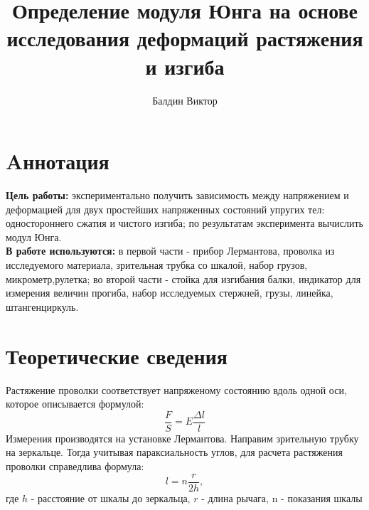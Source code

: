 \documentclass[12pt]{article}
\title{Определение модуля Юнга на основе исследования деформаций растяжения и изгиба}
\author{Балдин Виктор}
\begin{document}
    \maketitle

    \section{Aннотация}
    \textbf{Цель работы:} экспериментально получить зависимость между напряжением и деформацией
    для двух простейших напряженных состояний упругих тел: одностороннего сжатия и чистого изгиба;
    по результатам эксперимента вычислить модул Юнга.\\
    \textbf{В работе используются:} в первой части - прибор Лермантова, проволка
    из исследуемого материала,
     зрительная трубка со шкалой,
    набор грузов, микрометр,рулетка;  во второй части - стойка для изгибания балки, индикатор для
    измерения величин прогиба,
набор исследуемых стержней, грузы, линейка, штангенциркуль.

    \section{Теоретические сведения}
    Растяжение проволки соответствует напряженому состоянию вдоль одной оси, которое описывается формулой:
\begin{equation}
    \frac{F}{S} = E \frac{\Delta l}{l}
    \label{lermantov}
\end{equation}
Измерения производятся на установке Лермантова.
Направим зрительную трубку на зеркальце.
Тогда учитывая параксиальность углов,
для расчета растяжения проволки справедлива формула:
\begin{equation}
    l = n\frac{r}{2h},
    \label{dlina}
\end{equation}
где $h$ - расстояние от шкалы до зеркальца,
$r$ - длина рычага, n - показания шкалы\\
\end{document}
